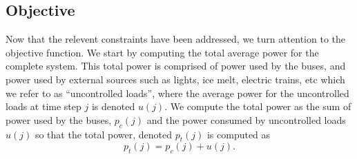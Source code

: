 \subsection{Objective\label{sec:objective}}

\par Now that the relevent constraints have been addressed, we turn attention to the objective function. We start by computing the total average power for the complete system. This total power is comprised of power used by the buses, and power used by external sources such as lights, ice melt, electric trains, etc which we refer to as ``uncontrolled loads'', where the average power for the uncontrolled loads at time step $j$ is denoted $u(j)$. We compute the total power as the sum of power used by the buses, $p_c(j)$ and the power consumed by uncontrolled loads $u(j)$ so that the total power, denoted $p_t(j)$ is computed as 
\begin{equation}\label{eqn:objective:pt}
	p_t(j) = p_c(j) + u(j).
\end{equation}
      
